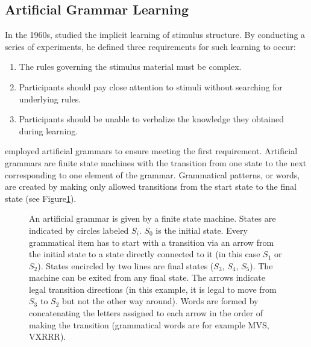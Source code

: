 \subsection{Artificial Grammar Learning}
In the 1960s, \citeauthor{reber1967implicit} studied the implicit learning of stimulus structure. By conducting a series of experiments, he defined three requirements \citep[p.~190]{reber1978analogic} for such learning to occur:
\begin{enumerate}
\item The rules governing the stimulus material must be complex.
\item Participants should pay close attention to stimuli without searching for underlying rules.
\item Participants should be unable to verbalize the knowledge they obtained during learning. 
\end{enumerate}
\citeauthor{reber1967implicit} employed artificial grammars to ensure meeting the first requirement. Artificial grammars are finite state machines with the transition from one state to the next corresponding to one element of the grammar. Grammatical patterns, or words, are created by making only allowed transitions from the start state to the final state (see Figure\ref{figure1}). 
\begin{figure}
\centering
\hspace*{-1.55cm}
\caption{An artificial grammar is given by a finite state machine. States are indicated by circles labeled $S_{i}$. $S_{0}$ is the initial state. Every grammatical item has to start with a transition via an arrow from the initial state to a state directly connected to it (in this case $S_{1}$ or $S_{2}$). States encircled by two lines are final states ($S_{3}$, $S_{4}$, $S_{5}$). The machine can be exited from any final state. The arrows indicate legal transition directions (in this example, it is legal to move from $S_{3}$ to $S_{2}$ but not the other way around). Words are formed by concatenating the letters assigned to each arrow in the order of making the transition (grammatical words are for example MVS, VXRRR).} 
\label{figure1}
\end{figure}
